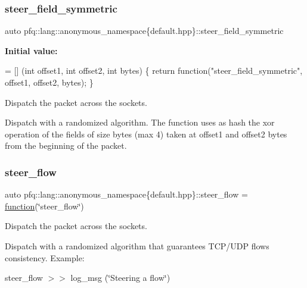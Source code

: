 \subsubsection{\texorpdfstring{steer\+\_\+field\+\_\+symmetric}{steer\_field\_symmetric}}
{\footnotesize\ttfamily auto pfq\+::lang\+::anonymous\+\_\+namespace\{default.\+hpp\}\+::steer\+\_\+field\+\_\+symmetric}

{\bfseries Initial value\+:}
\begin{DoxyCode}
= [] (\textcolor{keywordtype}{int} offset1, \textcolor{keywordtype}{int} offset2, \textcolor{keywordtype}{int} bytes) \{
                                \textcolor{keywordflow}{return} \textcolor{keyword}{function}(\textcolor{stringliteral}{"steer\_field\_symmetric"}, offset1, offset2, bytes);
                           \}
\end{DoxyCode}


Dispatch the packet across the sockets. 

Dispatch with a randomized algorithm. The function uses as {\ttfamily hash} the xor operation of the fields of {\ttfamily size} bytes (max 4) taken at {\ttfamily offset1} and {\ttfamily offset2} bytes from the beginning of the packet. \mbox{\label{namespacepfq_1_1lang_1_1anonymous__namespace_02default_8hpp_03_adeb44c976ac903e7b13addb65ac41f9f}} 
\subsubsection{\texorpdfstring{steer\+\_\+flow}{steer\_flow}}
{\footnotesize\ttfamily auto pfq\+::lang\+::anonymous\+\_\+namespace\{default.\+hpp\}\+::steer\+\_\+flow = \hyperlink{namespacepfq_1_1lang_a1a4638059d700ae08d0ca63886ff2bb3}{function}(\char`\"{}steer\+\_\+flow\char`\"{})}



Dispatch the packet across the sockets. 

Dispatch with a randomized algorithm that guarantees T\+C\+P/\+U\+DP flows consistency. Example\+:

steer\+\_\+flow $>$$>$ log\+\_\+msg (\char`\"{}\+Steering a flow\char`\"{}) \mbox{\label{namespacepfq_1_1lang_1_1anonymous__namespace_02default_8hpp_03_ac1f3f9a2caf886a1441e62860a4ca058}} 
